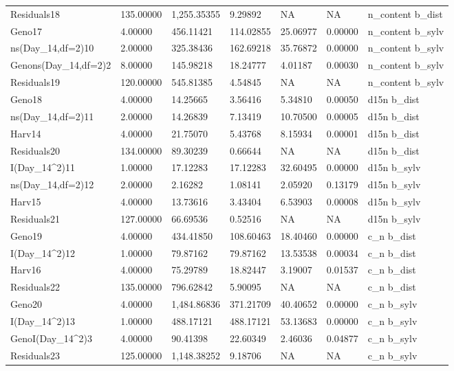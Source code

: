 \documentclass[jou,floatsintext]{apa6}
\begin{document}
\begin{table}[tbp]
\begin{center}
\begin{threeparttable}
{\begin{tabular}{lllllll}
Residuals18 & 135.00000 & 1,255.35355 & 9.29892 & NA & NA & n\_content b\_dist\\
Geno17 & 4.00000 & 456.11421 & 114.02855 & 25.06977 & 0.00000 & n\_content b\_sylv\\
ns(Day\_14,df=2)10 & 2.00000 & 325.38436 & 162.69218 & 35.76872 & 0.00000 & n\_content b\_sylv\\
Genons(Day\_14,df=2)2 & 8.00000 & 145.98218 & 18.24777 & 4.01187 & 0.00030 & n\_content b\_sylv\\
Residuals19 & 120.00000 & 545.81385 & 4.54845 & NA & NA & n\_content b\_sylv\\
Geno18 & 4.00000 & 14.25665 & 3.56416 & 5.34810 & 0.00050 & d15n b\_dist\\
ns(Day\_14,df=2)11 & 2.00000 & 14.26839 & 7.13419 & 10.70500 & 0.00005 & d15n b\_dist\\
Harv14 & 4.00000 & 21.75070 & 5.43768 & 8.15934 & 0.00001 & d15n b\_dist\\
Residuals20 & 134.00000 & 89.30239 & 0.66644 & NA & NA & d15n b\_dist\\
I(Day\_14\textasciicircum{}2)11 & 1.00000 & 17.12283 & 17.12283 & 32.60495 & 0.00000 & d15n b\_sylv\\
ns(Day\_14,df=2)12 & 2.00000 & 2.16282 & 1.08141 & 2.05920 & 0.13179 & d15n b\_sylv\\
Harv15 & 4.00000 & 13.73616 & 3.43404 & 6.53903 & 0.00008 & d15n b\_sylv\\
Residuals21 & 127.00000 & 66.69536 & 0.52516 & NA & NA & d15n b\_sylv\\
Geno19 & 4.00000 & 434.41850 & 108.60463 & 18.40460 & 0.00000 & c\_n b\_dist\\
I(Day\_14\textasciicircum{}2)12 & 1.00000 & 79.87162 & 79.87162 & 13.53538 & 0.00034 & c\_n b\_dist\\
Harv16 & 4.00000 & 75.29789 & 18.82447 & 3.19007 & 0.01537 & c\_n b\_dist\\
Residuals22 & 135.00000 & 796.62842 & 5.90095 & NA & NA & c\_n b\_dist\\
Geno20 & 4.00000 & 1,484.86836 & 371.21709 & 40.40652 & 0.00000 & c\_n b\_sylv\\
I(Day\_14\textasciicircum{}2)13 & 1.00000 & 488.17121 & 488.17121 & 53.13683 & 0.00000 & c\_n b\_sylv\\
GenoI(Day\_14\textasciicircum{}2)3 & 4.00000 & 90.41398 & 22.60349 & 2.46036 & 0.04877 & c\_n b\_sylv\\
Residuals23 & 125.00000 & 1,148.38252 & 9.18706 & NA & NA & c\_n b\_sylv\\
\bottomrule
\end{tabular}
}
\end{threeparttable}
\end{center}
\end{table}
\end{document}

